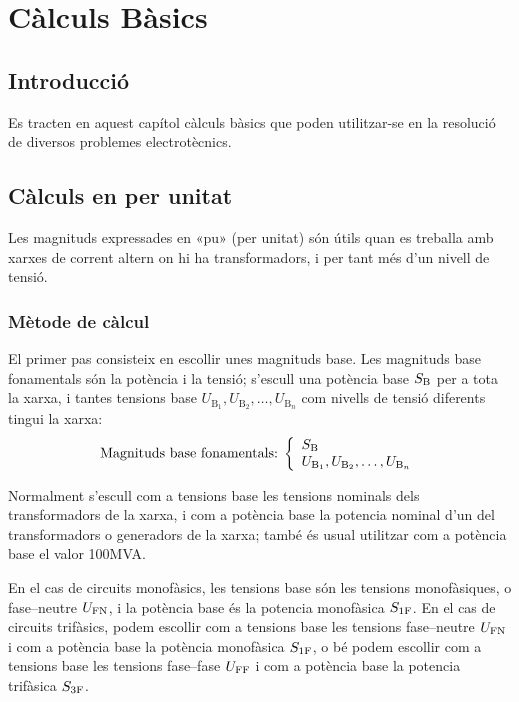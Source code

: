 \chapter{Càlculs Bàsics}\label{sec:calc_bas}

\section{Introducció}
Es tracten en aquest capítol càlculs bàsics que poden utilitzar-se en la
resolució de diversos problemes electrotècnics.



\section{Càlculs en per unitat} \label{sec:seccio_pu} 

Les magnituds expressades en «pu» (per unitat) són útils quan es treballa
amb xarxes de corrent altern on hi ha transformadors, i per tant més d'un nivell de tensió.

\subsection{Mètode de càlcul} 

 El primer pas consisteix en
escollir unes magnituds base. Les magnituds base fonamentals són la
potència i la tensió; s'escull una potència base $S_\mathrm{B}$ per a
tota la xarxa, i tantes tensions base $U_{\text{B}_1}, U_{\text{B}_2}, \ldots,
U_{\text{B}_n}$ com nivells de tensió
diferents tingui la xarxa:
\begin{equation}
   \text{Magnituds base fonamentals:}\;\left\{
\begin{array}{l}
   S_\mathrm{B} \\
   U_{\text{B}_1}, U_{\text{B}_2}, \ldots, U_{\text{B}_n}
\end{array}
\right.
\end{equation}

Normalment s'escull com a tensions base les tensions nominals dels transformadors de la
xarxa, i com a potència base la potencia nominal d'un del transformadors o generadors de la xarxa; també és usual utilitzar com a potència base el valor 100\unit{MVA}.

En el cas de circuits monofàsics, les tensions base són les tensions monofàsiques, o fase--neutre $U_\mathrm{FN}$, i la potència base és la potencia monofàsica $S_\mathrm{1F}$. En el cas de circuits trifàsics, podem escollir com a tensions base les tensions fase--neutre $U_\mathrm{FN}$ i com a potència base la potència  monofàsica $S_\mathrm{1F}$, o bé podem escollir com a tensions base les tensions fase--fase $U_\mathrm{FF}$ i com a potència base la potencia trifàsica $S_\mathrm{3F}$.

